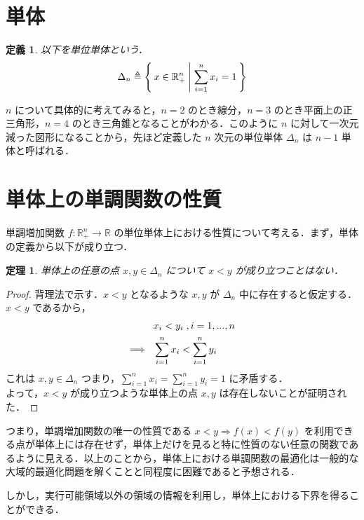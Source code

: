 \documentclass[a4paper,11pt]{jreport}
\newtheorem{definition}{定義}
\newtheorem{theorem}{定理}
\begin{document}
\section{単体}

\begin{definition}
以下を単位単体という．
$$ \Delta_n \triangleq \Set{ x \in \mathbb{R}^n_{+} | \sum_{i=1}^{n} x_i = 1 } $$
\end{definition}

$ n $ について具体的に考えてみると，$ n=2 $ のとき線分，$ n=3 $ のとき平面上の正三角形，$ n=4 $ のとき三角錐となることがわかる．このように $n$ に対して一次元減った図形になることから，先ほど定義した $n$ 次元の単位単体 $ \Delta_n $ は $ n-1 $ 単体と呼ばれる．\par

\section{単体上の単調関数の性質}

単調増加関数 $ f : \mathbb{R}^n_{+} \to \mathbb{R} $ の単位単体上における性質について考える．まず，単体の定義から以下が成り立つ．\\

\begin{theorem}
単体上の任意の点 $ x, y \in \Delta_n $ について $ x < y $ が成り立つことはない．
\end{theorem}

\begin{proof}
背理法で示す．$ x < y $ となるような $ x, y $ が $ \Delta_n $ 中に存在すると仮定する．\\
$ x < y $ であるから，
\begin{align}
& x_i < y_i \;, i = 1, ..., n \notag \\
\Longrightarrow \hspace{8pt} & \sum_{i=1}^n x_i < \sum_{i=1}^n y_i \notag
\end{align}
これは $ x, y \in \Delta_n $ つまり，$ \sum_{i=1}^n x_i = \sum_{i=1}^n y_i = 1 $ に矛盾する．\\
よって，$ x < y $ が成り立つような単体上の点 $ x, y $ は存在しないことが証明された．
\end{proof}

つまり，単調増加関数の唯一の性質である $ x < y \Rightarrow f(x) < f(y) $ を利用できる点が単体上には存在せず，単体上だけを見ると特に性質のない任意の関数であるように見える．以上のことから，単体上における単調関数の最適化は一般的な大域的最適化問題を解くことと同程度に困難であると予想される．\par
しかし，実行可能領域以外の領域の情報を利用し，単体上における下界を得ることができる．\\
\end{document}
